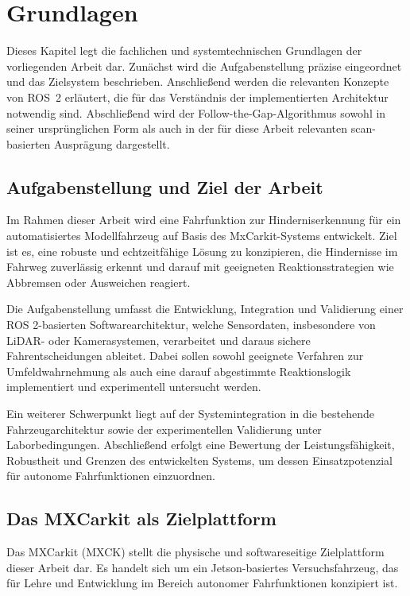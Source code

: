 \chapter{Grundlagen}
\label{ch:grundlagen}

Dieses Kapitel legt die fachlichen und systemtechnischen Grundlagen der
vorliegenden Arbeit dar. Zunächst wird die Aufgabenstellung präzise
eingeordnet und das Zielsystem beschrieben. Anschließend werden die
relevanten Konzepte von ROS~2 erläutert, die für das Verständnis der
implementierten Architektur notwendig sind. Abschließend wird der
Follow-the-Gap-Algorithmus sowohl in seiner ursprünglichen Form als auch
in der für diese Arbeit relevanten scan-basierten Ausprägung dargestellt.


\section{Aufgabenstellung und Ziel der Arbeit}

Im Rahmen dieser Arbeit wird eine Fahrfunktion zur Hinderniserkennung für ein automatisiertes Modellfahrzeug auf Basis des MxCarkit-Systems entwickelt. Ziel ist es, eine robuste und echtzeitfähige Lösung zu konzipieren, die Hindernisse im Fahrweg zuverlässig erkennt und darauf mit geeigneten Reaktionsstrategien wie Abbremsen oder Ausweichen reagiert.

Die Aufgabenstellung umfasst die Entwicklung, Integration und Validierung einer ROS 2-basierten Softwarearchitektur, welche Sensordaten, insbesondere von LiDAR- oder Kamerasystemen, verarbeitet und daraus sichere Fahrentscheidungen ableitet. Dabei sollen sowohl geeignete Verfahren zur Umfeldwahrnehmung als auch eine darauf abgestimmte Reaktionslogik implementiert und experimentell untersucht werden.

Ein weiterer Schwerpunkt liegt auf der Systemintegration in die bestehende Fahrzeugarchitektur sowie der experimentellen Validierung unter Laborbedingungen. Abschließend erfolgt eine Bewertung der Leistungsfähigkeit, Robustheit und Grenzen des entwickelten Systems, um dessen Einsatzpotenzial für autonome Fahrfunktionen einzuordnen.

\section{Das MXCarkit als Zielplattform}

Das MXCarkit (MXCK) stellt die physische und softwareseitige
Zielplattform dieser Arbeit dar. Es handelt sich um ein
Jetson-basiertes Versuchsfahrzeug, das für Lehre und Entwicklung im
Bereich autonomer Fahrfunktionen konzipiert ist. 

